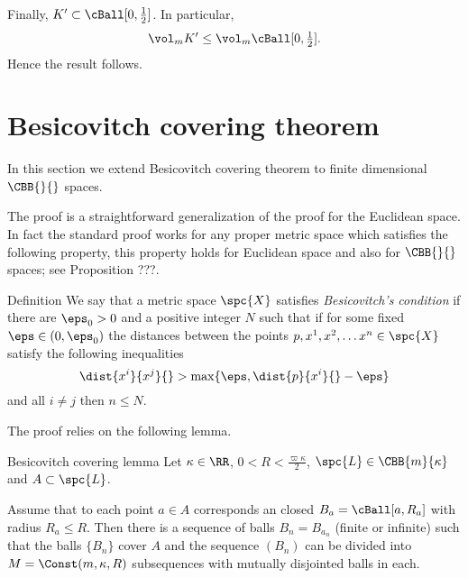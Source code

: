 Finally,
$K'\subset \cBall[0,\tfrac 12]$.
In particular,
\[\vol_m K'\le \vol_m \cBall[0,\tfrac 12].\]
Hence the result follows.\qeds























\section{Besicovitch covering theorem}\label{sec:besicovitch-covering}

In this section we extend Besicovitch covering theorem to finite dimensional $\CBB{}{}$ spaces.



The proof is a straightforward generalization of the proof for the Euclidean space. 
In fact the standard proof works for any proper metric space which satisfies the following property,
this property holds for Euclidean space
and also for $\CBB{}{}$ spaces; see Proposition ???.

\begin{thm}{Definition}
We say that a metric space $\spc{X}$ 
satisfies \emph{Besicovitch's condition} if there are $\eps_0>0$
and a positive integer $N$
such that if for some fixed $\eps\in(0,\eps_0)$ 
the distances between the points $p,x^1,x^2,\dots x^n\in\spc{X}$
satisfy the following inequalities
\[\dist{x^i}{x^j}{}>\max\{\eps,\dist{p}{x^i}{}-\eps\}\] 
and all $i\ne j$ 
then
$n\le N$.
\end{thm}



The proof relies on the following lemma.

\begin{thm}{Besicovitch covering lemma}\label{lem:besicovitch-covering}
Let $\kappa\in\RR$,
$0<R<\tfrac{\varpi\kappa}2$, 
$\spc{L}\in \CBB{m}{\kappa}$ and $A\subset\spc{L}$.

Assume that to each point $a\in A$
corresponds an closed $B_a=\cBall[a,R_a]$ with radius 
$R_a\le R$.
Then there is a sequence of balls $B_n=B_{a_n}$ (finite or infinite) such that
the balls $\{B_n\}$ cover $A$
and the sequence $(B_n)$ can be divided into $M=\Const(m,\kappa,R)$ subsequences with mutually disjointed balls in each.
\end{thm}

